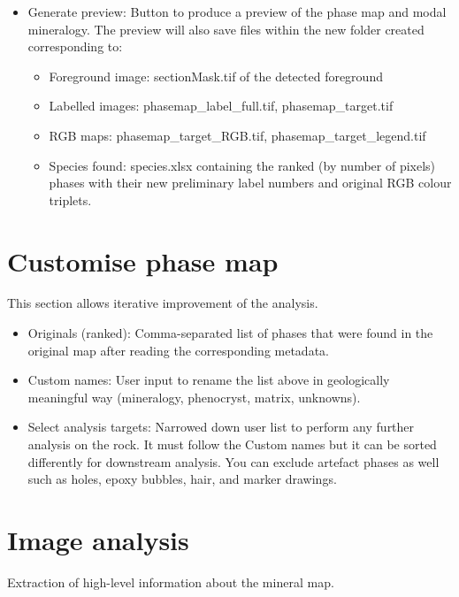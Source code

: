 \begin{itemize}
		\item Generate preview: Button to produce a preview of the phase map and modal mineralogy. The preview will also save files within the new folder created corresponding to:
			\begin{itemize}				
				\item Foreground image: sectionMask.tif of the detected foreground
				\item Labelled images: phasemap\_label\_full.tif, phasemap\_target.tif
				\item RGB maps: phasemap\_target\_RGB.tif, phasemap\_target\_legend.tif
				\item Species found: species.xlsx containing the ranked (by number of pixels) phases with their new preliminary label numbers and original RGB colour triplets.
				
			\end{itemize}
		\end{itemize}
	
	\section{Customise phase map}
	
	This section allows iterative improvement of the analysis.
		
		\begin{itemize}
			
			\item Originals (ranked): Comma-separated list of phases that were found in the original map after reading the corresponding metadata.
			\item Custom names: User input to rename the list above in geologically meaningful way (mineralogy, phenocryst, matrix, unknowns).
			\item Select analysis targets: Narrowed down user list to perform any further analysis on the rock. It must follow the Custom names but it can be sorted differently for downstream analysis. You can exclude artefact phases as well such as holes, epoxy bubbles, hair, and marker drawings.
			
		\end{itemize}
		
	\section{Image analysis}
	
	Extraction of high-level information about the mineral map.
		

